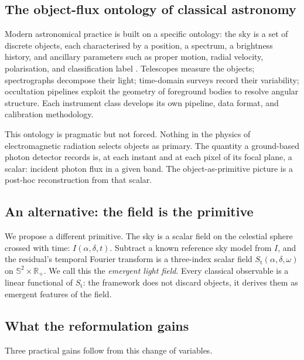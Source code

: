 \documentclass[11pt,twocolumn,a4paper]{article}
\theoremstyle{definition}
\theoremstyle{remark}
\newcommand{\Sfield}{S_{\mathrm{t}}}
\newcommand{\RA}{\alpha}
\newcommand{\Dec}{\delta}
\begin{document}
\subsection{The object-flux ontology of classical astronomy}

Modern astronomical practice is built on a specific ontology: the sky
is a set of discrete objects, each characterised by a position, a
spectrum, a brightness history, and ancillary parameters such as
proper motion, radial velocity, polarisation, and classification
label \citep{binney2008}. Telescopes measure the objects; spectrographs
decompose their light; time-domain surveys record their variability;
occultation pipelines exploit the geometry of foreground bodies to
resolve angular structure. Each instrument class develops its own
pipeline, data format, and calibration methodology.

This ontology is pragmatic but not forced. Nothing in the physics of
electromagnetic radiation selects objects as primary. The quantity a
ground-based photon detector records is, at each instant and at each
pixel of its focal plane, a scalar: incident photon flux in a given
band. The object-as-primitive picture is a post-hoc reconstruction
from that scalar.

\subsection{An alternative: the field is the primitive}

We propose a different primitive. The sky is a scalar field on the
celestial sphere crossed with time: $I(\RA, \Dec, t)$. Subtract a
known reference sky model from $I$, and the residual's temporal
Fourier transform is a three-index scalar field
$\Sfield(\RA, \Dec, \omega)$ on $\mathbb{S}^2 \times \mathbb{R}_+$. We
call this the \emph{emergent light field}. Every classical observable
is a linear functional of $\Sfield$: the framework does not discard
objects, it derives them as emergent features of the field.

\subsection{What the reformulation gains}

Three practical gains follow from this change of variables.
\end{document}
